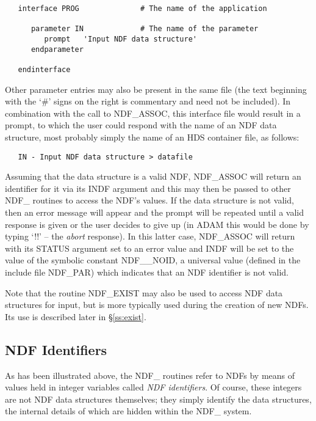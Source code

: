 \documentclass[twoside,11pt]{article}
\newcommand{\htmlref}[2]{#1}
\newcommand{\xref}[3]{#1}
\newcommand{\xlabel}[1]{}
\newcommand{\st}[1]{{\em{#1}}}
\begin{document}
\small
\begin{verbatim}
   interface PROG              # The name of the application

      parameter IN             # The name of the parameter
         prompt   'Input NDF data structure'
      endparameter

   endinterface
\end{verbatim}
\normalsize

Other parameter entries may also be present in the same file (the text
beginning with the `\#' signs on the right is commentary and need not be
included). 
In combination with the call to NDF\_ASSOC, this interface file would
result in a prompt, to which the user could respond with the name of
an NDF data structure, most probably simply the name of an
\xref{HDS}{sun92}{} container file, as follows:

\small
\begin{verbatim}
   IN - Input NDF data structure > datafile
\end{verbatim}
\normalsize

Assuming that the data structure is a valid NDF, NDF\_ASSOC will return an
identifier for it via its INDF argument and  this may then be passed to other
NDF\_ routines to access the NDF's values.
If the data structure is not valid, then an error message will appear
and the prompt will be repeated until a valid response is given or the
user decides to give up (in ADAM this would be done by typing `!!' --
the \st{abort\/} response).
In this latter case, NDF\_ASSOC will return with its STATUS argument set to
an error value and INDF will be set to the value of the symbolic constant
NDF\_\_NOID, a universal value (defined in the include file NDF\_PAR) which
indicates that an NDF identifier is not valid. 

Note that the routine \htmlref{NDF\_EXIST}{NDF_EXIST} may also be used to access NDF data 
structures for input, but is more typically used during the creation of new 
NDFs.
Its use is described later in \S\ref{ss:exist}.

\subsection{\xlabel{ndf_identifiers}\label{ss:identifiers}NDF Identifiers}

As has been illustrated above, the NDF\_ routines refer to NDFs by means of
values held in integer variables called \st{NDF identifiers}. 
Of course, these integers are not NDF data structures themselves; they simply
identify the data structures, the internal details of which are hidden within
the NDF\_ system.
\end{document}
